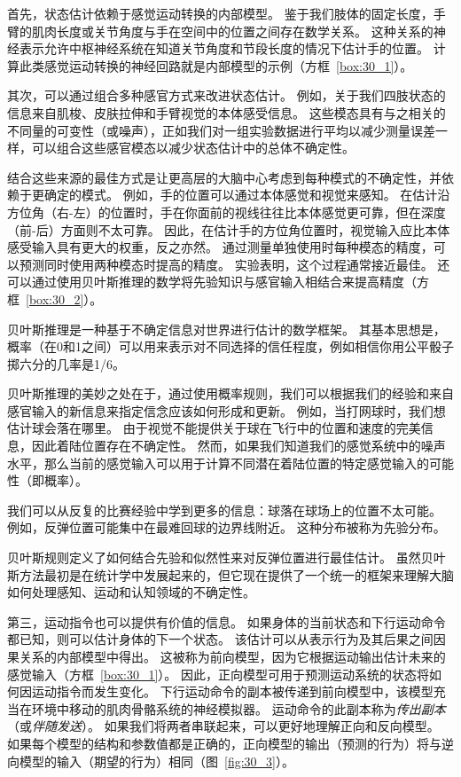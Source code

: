 首先，状态估计依赖于感觉运动转换的内部模型。
鉴于我们肢体的固定长度，手臂的肌肉长度或关节角度与手在空间中的位置之间存在数学关系。
这种关系的神经表示允许中枢神经系统在知道关节角度和节段长度的情况下估计手的位置。
计算此类感觉运动转换的神经回路就是内部模型的示例（方框~\ref{box:30_1}）。


其次，可以通过组合多种感官方式来改进状态估计。
例如，关于我们四肢状态的信息来自肌梭、皮肤拉伸和手臂视觉的本体感受信息。
这些模态具有与之相关的不同量的可变性（或噪声），正如我们对一组实验数据进行平均以减少测量误差一样，可以组合这些感官模态以减少状态估计中的总体不确定性。


结合这些来源的最佳方式是让更高层的大脑中心考虑到每种模式的不确定性，并依赖于更确定的模式。
例如，手的位置可以通过本体感觉和视觉来感知。
在估计沿方位角（右-左）的位置时，手在你面前的视线往往比本体感觉更可靠，但在深度（前-后）方面则不太可靠。
因此，在估计手的方位角位置时，视觉输入应比本体感受输入具有更大的权重，反之亦然。
通过测量单独使用时每种模态的精度，可以预测同时使用两种模态时提高的精度。
实验表明，这个过程通常接近最佳。
还可以通过使用贝叶斯推理的数学将先验知识与感官输入相结合来提高精度（方框~\ref{box:30_2}）。


\begin{proposition}[贝叶斯推断] \label{box:30_2}
	
	\quad \quad 贝叶斯推理是一种基于不确定信息对世界进行估计的数学框架。
	其基本思想是，概率（在0和1之间）可以用来表示对不同选择的信任程度，例如相信你用公平骰子掷六分的几率是1/6。
	
	\quad \quad 贝叶斯推理的美妙之处在于，通过使用概率规则，我们可以根据我们的经验和来自感官输入的新信息来指定信念应该如何形成和更新。
	例如，当打网球时，我们想估计球会落在哪里。
	由于视觉不能提供关于球在飞行中的位置和速度的完美信息，因此着陆位置存在不确定性。
	然而，如果我们知道我们的感觉系统中的噪声水平，那么当前的感觉输入可以用于计算不同潜在着陆位置的特定感觉输入的可能性（即概率）。
	
	\quad \quad 我们可以从反复的比赛经验中学到更多的信息：球落在球场上的位置不太可能。
	例如，反弹位置可能集中在最难回球的边界线附近。
	这种分布被称为先验分布。
	
	\quad \quad 贝叶斯规则定义了如何结合先验和似然性来对反弹位置进行最佳估计。
	虽然贝叶斯方法最初是在统计学中发展起来的，但它现在提供了一个统一的框架来理解大脑如何处理感知、运动和认知领域的不确定性。
	
\end{proposition}


第三，运动指令也可以提供有价值的信息。
如果身体的当前状态和下行运动命令都已知，则可以估计身体的下一个状态。
该估计可以从表示行为及其后果之间因果关系的内部模型中得出。
这被称为前向模型，因为它根据运动输出估计未来的感觉输入（方框~\ref{box:30_1}）。
因此，正向模型可用于预测运动系统的状态将如何因运动指令而发生变化。
下行运动命令的副本被传递到前向模型中，该模型充当在环境中移动的肌肉骨骼系统的神经模拟器。
运动命令的此副本称为\textit{传出副本}（或\textit{伴随发送}）。
如果我们将两者串联起来，可以更好地理解正向和反向模型。
如果每个模型的结构和参数值都是正确的，正向模型的输出（预测的行为）将与逆向模型的输入（期望的行为）相同（图~\ref{fig:30_3}）。


